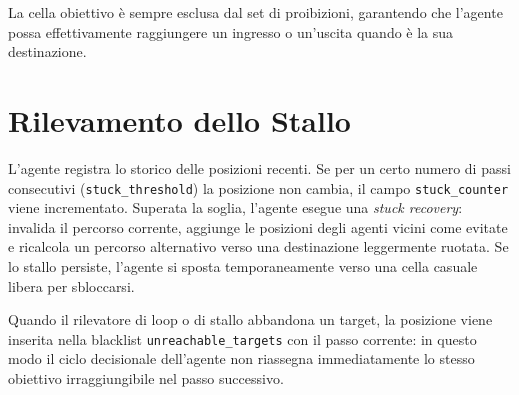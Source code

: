 La cella obiettivo \`e sempre esclusa dal set di proibizioni, garantendo che l'agente possa
effettivamente raggiungere un ingresso o un'uscita quando \`e la sua destinazione.

\section{Rilevamento dello Stallo}

L'agente registra lo storico delle posizioni recenti. Se per un certo numero di passi
consecutivi (\texttt{stuck\_threshold}) la posizione non cambia, il campo
\texttt{stuck\_counter} viene incrementato. Superata la soglia, l'agente esegue una
\textit{stuck recovery}: invalida il percorso corrente, aggiunge le posizioni degli
agenti vicini come evitate e ricalcola un percorso alternativo verso una destinazione
leggermente ruotata. Se lo stallo persiste, l'agente si sposta temporaneamente verso
una cella casuale libera per sbloccarsi.

Quando il rilevatore di loop o di stallo abbandona un target, la posizione viene inserita
nella blacklist \texttt{unreachable\_targets} con il passo corrente: in questo modo il
ciclo decisionale dell'agente non riassegna immediatamente lo stesso obiettivo irraggiungibile
nel passo successivo.
